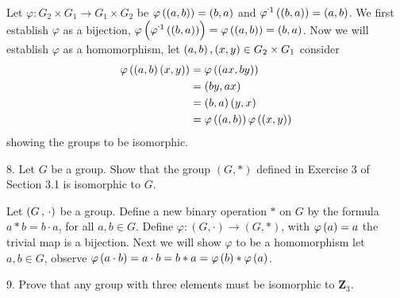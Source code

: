 \begin{mdframed}[style=darkAnswer,frametitle={Joe Starr}]
Let $\varphi:G_{2} \times G_{1} \to G_{1} \times G_{2}$ be 
$\varphi\left(\left(a,b\right)\right)=\left(b,a\right)$ and $\pofinv{\lrp{b,a}}=\lrp{a,b}$. We first 
establish $\varphi$ as a bijection, 
$\pof{\pofinv{(b,a)}}=\pof{\lrp{a,b}}=\lrp{b,a}$. Now we will establish $\varphi$
as a homomorphism, let $\left(a,b\right),\left(x,y\right)\in G_{2} \times G_{1}$
consider 
\begin{align*}
  \varphi\left(\left(a,b\right)\left(x,y\right)\right)&=\varphi\left(\left(ax,by\right)\right)\\
  &=\left(by,ax\right)\\
  &=\left(b,a\right)\left(y,x\right)\\
  &=\varphi\left(\left(a,b\right)\right)\varphi\left(\left(x,y\right)\right)\\
\end{align*}
showing the groups to be isomorphic. 
\end{mdframed}
\newpage
\begin{mdframed}[style=darkQuesion]
8. Let $G$ be a group. Show that the group $(G, *)$ defined in Exercise 3 of Section 3.1 is isomorphic to $G .$
\end{mdframed}
\begin{mdframed}[style=darkAnswer,frametitle={Joe Starr}]
  Let $\left(G\,,\,\cdot\right)$ be a group. Define a new binary operation $\ast$ on
  $G$ by the formula $a \ast b=b\cdot a$, for all $a,b\in G$. Define 
  $\varphi:(G, \cdot)\to(G, *) $, with $\varphi\left(a\right)=a$ the trivial map is a bijection. 
  Next we will show $\varphi$ to be a homomorphism let $a,b\in G$, observe 
  $\varphi\left(a\cdot b\right)= a\cdot b=b\ast a=\varphi\left(b\right)\ast\varphi\left(a\right)$.
\end{mdframed}
\newpage
\begin{mdframed}[style=darkQuesion]
9. Prove that any group with three elements must be isomorphic to $\mathbf{Z}_{3}$.
\end{mdframed}
